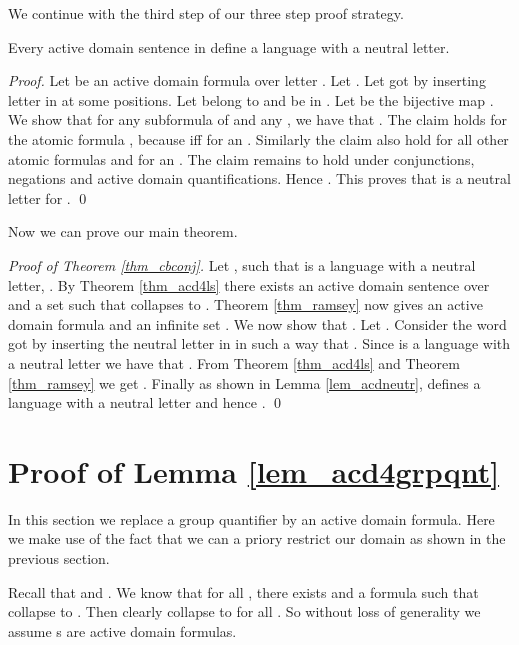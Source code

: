 \documentclass[envcountsame]{llncs}
\begin{document}
We continue with the third step of our three step proof strategy. 
\begin{lemma}
\label{lem_acdneutr}
 Every active domain sentence in  define a language with a neutral letter.
\end{lemma}
\begin{proof}
Let  be an active domain formula over letter . Let . 
Let  got by inserting letter  in  at some positions. Let  belong to  and 
 be in . Let  be the bijective map . We show that for any subformula 
 of  and any , we have that .
The claim holds for the atomic formula , because  iff  for an . Similarly the claim also
hold for all other atomic formulas  and  for an . The claim remains to hold under
conjunctions, negations and active domain quantifications. Hence .
This proves that  is a neutral letter for .
\qed \end{proof}

Now we can prove our main theorem.


\begin{proof}[Proof of Theorem \ref{thm_cbconj}]
Let , such that  is a language with a neutral letter, . By Theorem \ref{thm_acd4ls} there exists an active domain sentence  over  and a set  such that  collapses 
 to . Theorem \ref{thm_ramsey} now gives an active domain formula  and an infinite set . 
We now show that .
Let . Consider the word  got by inserting the neutral letter  in  in such a way 
that . Since  is a language with a neutral letter we have that . From Theorem \ref{thm_acd4ls} and 
Theorem \ref{thm_ramsey} we get
.
Finally as shown in Lemma \ref{lem_acdneutr},  defines a language with a neutral letter and hence . 
\qed \end{proof}



\bigskip
\section{Proof of Lemma \ref{lem_acd4grpqnt}} \label{sec_lemmaProof}
In this section we replace a group quantifier by an active domain formula. Here we make use of the fact that we can a priory restrict our domain as shown in the previous section.

Recall that  and . 
We know that for all , there exists  and a formula  such that  collapse  to . 
Then clearly  collapse  to  for all .
So without loss of generality we assume s are active domain formulas. 
\end{document}
